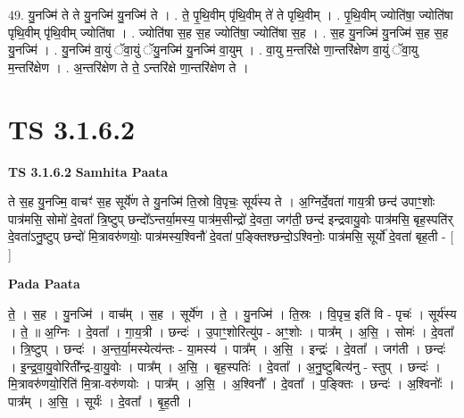 \documentclass[17pt]{extarticle}
\begin{document}
49. यु॒नज्मि॑ ते ते यु॒नज्मि॑ यु॒नज्मि॑ ते । . ते॒ पृ॒थि॒वीम् पृ॑थि॒वीम् ते॑ ते पृथि॒वीम् । . पृ॒थि॒वीम् ज्योति॑षा॒ ज्योति॑षा पृथि॒वीम् पृ॑थि॒वीम् ज्योति॑षा । . ज्योति॑षा स॒ह स॒ह ज्योति॑षा॒ ज्योति॑षा स॒ह । . स॒ह यु॒नज्मि॑ यु॒नज्मि॑ स॒ह स॒ह यु॒नज्मि॑ । . यु॒नज्मि॑ वा॒युं ॅवा॒युं ॅयु॒नज्मि॑ यु॒नज्मि॑ वा॒युम् । . वा॒यु म॒न्तरि॑क्षे णा॒न्तरि॑क्षेण वा॒युं ॅवा॒यु म॒न्तरि॑क्षेण । . अ॒न्तरि॑क्षेण ते ते॒ ऽन्तरि॑क्षे णा॒न्तरि॑क्षेण ते । \newline
\pagebreak
{}

\section{ TS 3.1.6.2 }

\textbf{TS 3.1.6.2 } \newline
\textbf{Samhita Paata} \newline

ते स॒ह यु॒नज्मि॒ वाचꣳ॑ स॒ह सूर्ये॑ण ते यु॒नज्मि॑ ति॒स्रो वि॒पृचः॒ सूर्य॑स्य ते । अ॒ग्निर्दे॒वता॑ गाय॒त्री छन्द॑ उपाꣳ॒॒शोः पात्र॑मसि॒ सोमो॑ दे॒वता᳚ त्रि॒ष्टुप् छन्दो᳚ऽन्तर्या॒मस्य॒ पात्र॑म॒सीन्द्रो॑ दे॒वता॒ जग॑ती॒ छन्द॑ इन्द्रवायु॒वोः पात्र॑मसि॒ बृह॒स्पति॑र् दे॒वता॑ऽनु॒ष्टुप् छन्दो॑ मि॒त्रावरु॑णयोः॒ पात्र॑मस्य॒श्विनौ॑ दे॒वता॑ प॒ङ्क्तिश्छन्दो॒ऽश्विनोः॒ पात्र॑मसि॒ सूर्यो॑ दे॒वता॑ बृह॒ती - [  ] \newline

\textbf{Pada Paata} \newline

ते॒ । स॒ह । यु॒नज्मि॑ । वाच᳚म् । स॒ह । सूर्ये॑ण । ते॒ । यु॒नज्मि॑ । ति॒स्रः । वि॒पृच॒ इति॑ वि - पृचः॑ । सूर्य॑स्य । ते॒ ॥ अ॒ग्निः । दे॒वता᳚ । गा॒य॒त्री । छन्दः॑ । उ॒पाꣳ॒॒शोरित्यु॑प - अꣳ॒॒शोः । पात्र᳚म् । अ॒सि॒ । सोमः॑ । दे॒वता᳚ । त्रि॒ष्टुप् । छन्दः॑ । अ॒न्त॒र्या॒मस्येत्य॑न्तः - या॒मस्य॑ । पात्र᳚म् । अ॒सि॒ । इन्द्रः॑ । दे॒वता᳚ । जग॑ती । छन्दः॑ । इ॒न्द्र॒वा॒यु॒वोरिती᳚न्द्र-वा॒यु॒वोः । पात्र᳚म् । अ॒सि॒ । बृह॒स्पतिः॑ । दे॒वता᳚ । अ॒नु॒ष्टुबित्य॑नु - स्तुप् । छन्दः॑ । मि॒त्रावरु॑णयो॒रिति॑ मि॒त्रा-वरु॑णयोः । पात्र᳚म् । अ॒सि॒ । अ॒श्विनौ᳚ । दे॒वता᳚ । प॒ङ्क्तिः । छन्दः॑ । अ॒श्विनोः᳚ । पात्र᳚म् । अ॒सि॒ । सूर्यः॑ । दे॒वता᳚ । बृ॒ह॒ती ।  \newline
\end{document}
